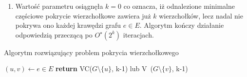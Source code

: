 {\begin{bproof}
\begin{enumerate}
      \item Wartość parametru osiągnęła $k=0$ co oznacza, iż odnalezione minimalne częściowe pokrycie wierzchołkowe zawiera już $k$ wierzchołków, lecz nadal nie pokrywa ono każdej krawędzi grafu $e \in E$.
      Algorytm kończy działanie odpowiedzią przeczącą po $O^\star(2^k)$ iteracjach.
    \end{enumerate}
  \end{bproof}
  \begin{algorithm}
    \caption{Algorytm rozwiązujący problem pokrycia wierzchołkowego}\label{alg_VC1}
    \begin{algorithmic}[1]
        \EndIf
        \EndIf
        \State $(u,v) \leftarrow e \in E$
        \State \textbf{return} {VC($G\setminus \{u\}$, k-1) lub V~($G\setminus \{v\}$, k-1)}
      \EndFunction
    \end{algorithmic}
  \end{algorithm}
}
